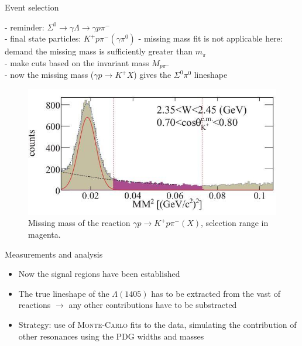 \documentclass[11pt,aspectratio=1610,dvipsnames]{beamer}
\begin{document}
\begin{frame}{Event selection}
	\begin{minipage}{\linewidth}
		\begin{tcolorbox}[colback=black!10,colframe=gray!20!black,title=extracting $\Sigma^0\pi^0$] 
			- reminder: $\Sigma^0\to\gamma\Lambda\to\gamma p \pi^-$\\
			- final state particles: $K^+ p \pi^-(\gamma\pi^0)$
			- missing mass fit is not applicable here: \phantom{- }demand the missing mass is sufficiently greater than $m_\pi$\\
			- make cuts based on the invariant mass $M_{p\pi^-}$\\
			- now the missing mass ($\gamma p\to K^+ X$) gives the $\Sigma^0\pi^0$ lineshape
		\end{tcolorbox}	
	\end{minipage}
\begin{figure}
	\centering
	\includegraphics[width=.5\linewidth]{mism}
	\caption*{Missing  mass of the reaction $\gamma p \to K^+p\pi^-(X)$, selection range in magenta.  \citet{lineshapes}}
\end{figure}
\end{frame}




\begin{frame}{Measurements and analysis}
	\begin{itemize}
		\item Now the signal regions have been established
		\item The true lineshape of the $\Lambda(1405)$ has to be extracted from the vast of reactions $\to$ any other contributions have to be substracted
		\item Strategy: use of \textsc{Monte-Carlo} fits to the data, simulating the contribution of other resonances using the PDG widths and masses
		
	\end{itemize}
\end{frame}
\end{document}
